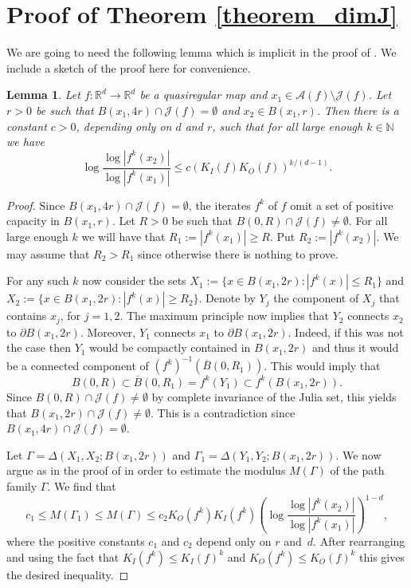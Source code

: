 \documentclass[12pt,a4paper]{amsart}
\theoremstyle{plain}
\newtheorem{lemma}[theorem]{Lemma}
\theoremstyle{definition}
\theoremstyle{remark}
\numberwithin{equation}{section}
\begin{document}
\section{Proof of Theorem \ref{theorem_dimJ}}\label{proof_theorem_dimJ}
We are going to need the following lemma which is implicit in the proof
of \cite[Theorem 1.2]{BFN}. We include a sketch of the proof here for  convenience.
\begin{lemma}\label{lemma5.1}
Let $f\colon\mathbb{R}^d\to\mathbb{R}^d$ be a quasiregular map and
$x_1\in \mathcal{A}(f)\setminus\mathcal{J}(f)$. Let $r>0$ be such that
$B(x_1,4r)\cap \mathcal{J}(f)=\emptyset$ and $x_2\in B(x_1,r)$. 
Then there is a constant $c>0$, depending only on $d$ and $r$, such that for all 
large enough $k\in\mathbb{N}$ we have 
\[
\log\frac{\log|f^k(x_2)|}{\log|f^k(x_1)|}\leq c\left(K_I(f)K_O(f)\right)^{k/(d-1)} .
\]
\end{lemma}
\begin{proof}
Since $B(x_1,4r)\cap \mathcal{J}(f)=\emptyset$, the iterates $f^k$ of $f$ omit
a set of positive capacity in $B(x_1,r)$. Let $R>0$ be such that
$B(0,R)\cap \mathcal{J}(f)\not=\emptyset$. For all large enough $k$ we will
have that $R_1:=|f^k(x_1)|\geq R$. Put $R_2:=|f^k(x_2)|$. We may assume
that $R_2>R_1$ since otherwise there is nothing to prove.
	
For any such $k$ now consider the sets $X_1:=\{x\in B(x_1,2r)\colon |f^k(x)|\leq R_1\}$
and $X_2:=\{x\in B(x_1,2r)\colon |f^k(x)|\geq R_2\}$. Denote by $Y_j$ the component of
$X_j$ that contains $x_j$, for $j=1,2$. The maximum principle now implies that $Y_2$
connects $x_2$ to $\partial B(x_1,2r)$. Moreover, $Y_1$  connects $x_1$ to 
$\partial B(x_1,2r)$. Indeed, if this was not the case then  $Y_1$ would be
compactly contained in $B(x_1,2r)$ and thus it would be a connected component
of $(f^k)^{-1}\!\left(\overline{B}(0,R_1)\right)$. This would imply that
\[
B(0,R)\subset \overline{B}(0,R_1)=f^k\!\left(Y_1\right)\subset f^k\!\left(B(x_1,2r)\right).
\]
Since $B(0,R)\cap \mathcal{J}(f)\not= \emptyset$ by complete invariance of
the Julia set, this yields that $B(x_1,2r)\cap \mathcal{J}(f)\not=\emptyset$. 
This is a contradiction since $B(x_1,4r)\cap \mathcal{J}(f)=\emptyset$.
	
Let $\Gamma=\Delta\!\left(X_1,X_2;B(x_1,2r)\right)$ and
$\Gamma_1= \Delta\!\left(Y_1,Y_2;B(x_1,2r)\right)$. We now argue as in the proof
of \cite[Theorem 1.2]{BFN} in order to estimate the modulus $M(\Gamma)$ of the path
family $\Gamma$. We find that
\[
c_1\leq M\!\left(\Gamma_1\right) \leq M(\Gamma)
\leq c_2 K_O(f^k)K_I(f^k)\left(\log\frac{\log |f^k(x_2)|}{\log|f^k(x_1)|}\right)^{1-d},
\]
where the positive constants $c_1$ and $c_2$ depend only on $r$ and~$d$. After
rearranging and using the fact that $K_I(f^k)\leq K_I(f)^k$ and
$K_O(f^k)\leq K_O(f)^k$ this gives the desired inequality.
\end{proof}
\end{document}
